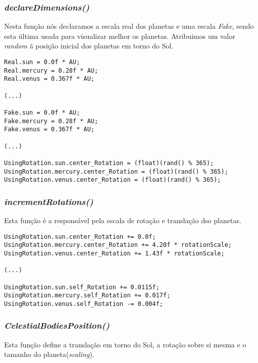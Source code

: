 \subsubsection{\textit{declareDimensions()}}
Nesta função nós declaramos a escala real dos planetas e uma escala \textit{Fake}, sendo esta última usada para visualizar melhor os planetas. Atribuimos um valor \textit{random} ã posição inicial dos planetas em torno do Sol.
\newpage
\begin{lstlisting}[caption=\textit{Pequeno excerto da função declareDimensions()}.]
Real.sun = 0.0f * AU;
Real.mercury = 0.28f * AU;
Real.venus = 0.367f * AU;

(...)

Fake.sun = 0.0f * AU;
Fake.mercury = 0.28f * AU;
Fake.venus = 0.367f * AU;

(...)

UsingRotation.sun.center_Rotation = (float)(rand() % 365);
UsingRotation.mercury.center_Rotation = (float)(rand() % 365);
UsingRotation.venus.center_Rotation = (float)(rand() % 365);
\end{lstlisting}

\subsubsection{\textit{incrementRotations()}}
Esta função é a responsável pela escala de rotação e translação dso planetas.
\begin{lstlisting}[caption=\textit{ Pequeno excerto da função incrementRotations()}.]
UsingRotation.sun.center_Rotation += 0.0f;
UsingRotation.mercury.center_Rotation += 4.20f * rotationScale;
UsingRotation.venus.center_Rotation += 1.43f * rotationScale;

(...)

UsingRotation.sun.self_Rotation += 0.0115f;
UsingRotation.mercury.self_Rotation += 0.017f;
UsingRotation.venus.self_Rotation -= 0.004f;
\end{lstlisting}

\subsubsection{\textit{CelestialBodiesPosition()}}
Esta função define a translação em torno do Sol, a rotação sobre si mesma e o tamanho do planeta(\textit{scaling}).

